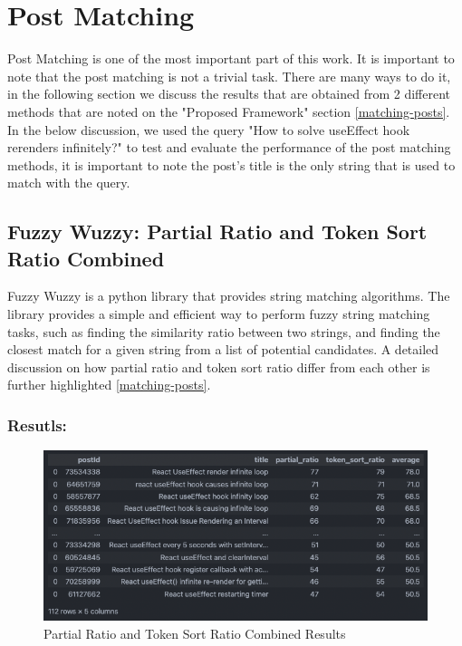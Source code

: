 \section{Post Matching} \label{post-matching_results}
Post Matching is one of the most important part of this work. It is important to note that the post matching is not a trivial task. There are many ways to do it, in the following section we discuss the results that are obtained from 2 different methods that are noted on the "Proposed Framework" section \ref{matching-posts}. In the below discussion, we used the query "How to solve useEffect hook rerenders infinitely?" to test and evaluate the performance of the post matching methods, it is important to note the post's title is the only string that is used to match with the query.

\subsection{Fuzzy Wuzzy: Partial Ratio and Token Sort Ratio Combined} \label{fuzzy-wuzzy_results}
Fuzzy Wuzzy is a python library that provides string matching algorithms. The library provides a simple and efficient way to perform fuzzy string matching tasks, such as finding the similarity ratio between two strings, and finding the closest match for a given string from a list of potential candidates. A detailed discussion on how partial ratio and token sort ratio differ from each other is further highlighted \ref{matching-posts}.

\subsubsection{Resutls:} \label{partial-ratio_results}
\begin{figure}[H]
  \centering
  \includegraphics[scale=0.60]{assets/fuzzy-wuzzy-query-1-results.png}
  \caption{Partial Ratio and Token Sort Ratio Combined Results}
  \label{fig:partial-ratio}
\end{figure}


